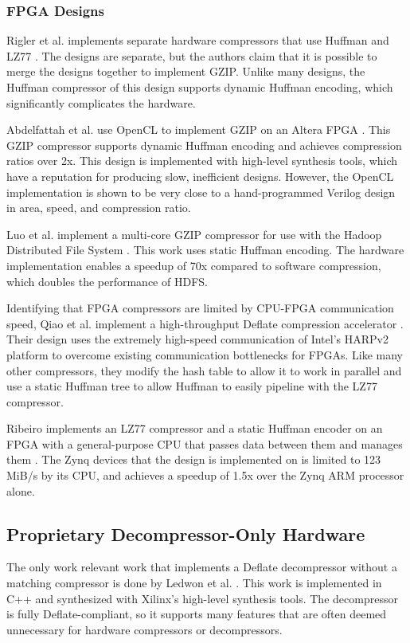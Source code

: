 \documentclass[doublespace,draft,nopageskip]{VTthesis} %
\begin{document}
\subsubsection{FPGA Designs}\label{sss:fpga_designs}

Rigler et al. implements separate hardware compressors that use Huffman and LZ77 \cite{fpgahuffmanlz77}. The designs are separate, but the authors claim that it is possible to merge the designs together to implement GZIP. Unlike many designs, the Huffman compressor of this design supports dynamic Huffman encoding, which significantly complicates the hardware.

Abdelfattah et al. use OpenCL to implement GZIP on an Altera FPGA \cite{gziponachip}. This GZIP compressor supports dynamic Huffman encoding and achieves compression ratios over 2x. This design is implemented with high-level synthesis tools, which have a reputation for producing slow, inefficient designs. However, the OpenCL implementation is shown to be very close to a hand-programmed Verilog design in area, speed, and compression ratio.

Luo et al. implement a multi-core GZIP compressor for use with the Hadoop Distributed File System \cite{hdfsgzip}. This work uses static Huffman encoding. The hardware implementation enables a speedup of 70x compared to software compression, which doubles the performance of HDFS.

Identifying that FPGA compressors are limited by CPU-FPGA communication speed, Qiao et al. implement a high-throughput Deflate compression accelerator \cite{fpgadeflate}. Their design uses the extremely high-speed communication of Intel's HARPv2 platform to overcome existing communication bottlenecks for FPGAs. Like many other compressors, they modify the hash table to allow it to work in parallel and use a static Huffman tree to allow Huffman to easily pipeline with the LZ77 compressor.

Ribeiro implements an LZ77 compressor and a static Huffman encoder on an FPGA with a general-purpose CPU that passes data between them and manages them \cite{ribeiro}. The Zynq devices that the design is implemented on is limited to 123 MiB/s by its CPU, and achieves a speedup of 1.5x over the Zynq ARM processor alone.

\subsection{Proprietary Decompressor-Only Hardware}\label{proprietary_decompressor-only_hardware}
The only work relevant work that implements a Deflate decompressor without a matching compressor is done by Ledwon et al. \cite{deflatedecompression}. This work is implemented in C++ and synthesized with Xilinx's high-level synthesis tools. The decompressor is fully Deflate-compliant, so it supports many features that are often deemed unnecessary for hardware compressors or decompressors.
\end{document}
